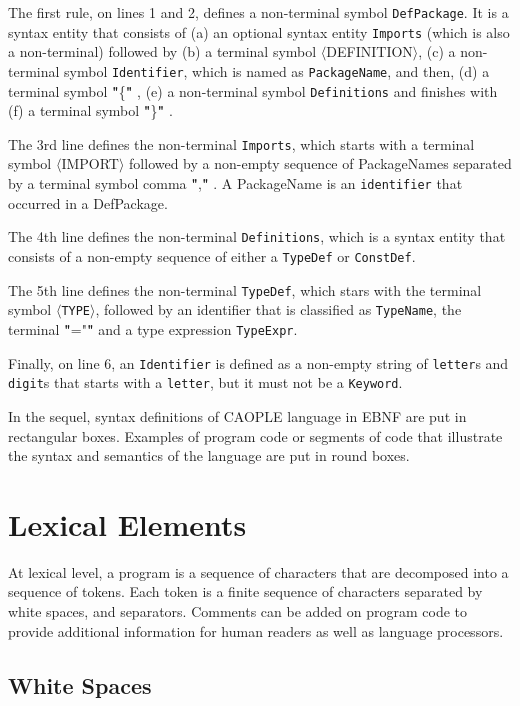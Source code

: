 \documentclass[english]{report}
\newcommand{\tml}[1]{\color{blue}$\langle$#1$\rangle$\color{black}}
\newcommand{\lit}[1]{\color{red} \textbf{"}\color{blue}#1\color{red}\textbf{"} \color{black}}
\begin{document}
The first rule, on lines 1 and 2, defines a non-terminal symbol \texttt{DefPackage}. It is a syntax entity that consists of (a) an optional syntax entity \texttt{Imports} (which is also a non-terminal) followed by (b) a terminal symbol \tml{DEFINITION}, (c) a non-terminal symbol \texttt{Identifier}, which is named as \texttt{PackageName}, and then, (d) a terminal symbol \lit{\{}, (e) a non-terminal symbol \texttt{Definitions} and finishes with (f) a terminal symbol \lit{\}}. 

The 3rd line defines the non-terminal \texttt{Imports}, which starts with a terminal symbol \tml{IMPORT} followed by a non-empty sequence of PackageNames separated by a terminal symbol comma \lit{,}. A PackageName is an \texttt{identifier} that occurred in a DefPackage.  

The 4th line defines the non-terminal \texttt{Definitions}, which is a syntax entity that consists of a non-empty sequence of either a \texttt{TypeDef} or \texttt{ConstDef}. 

The 5th line defines the non-terminal \texttt{TypeDef}, which stars with the terminal symbol \texttt{\tml{TYPE}}, followed by an identifier that is classified as \texttt{TypeName}, the terminal \lit{="} and a type expression \texttt{TypeExpr}. 

Finally, on line 6, an \texttt{Identifier} is defined as a non-empty string of \texttt{letter}s and \texttt{digit}s that starts with a \texttt{letter}, but it must not be a \texttt{Keyword}. 

In the sequel, syntax definitions of CAOPLE language in EBNF are put in rectangular boxes. Examples of program code or segments of code that illustrate the syntax and semantics of the language are put in round boxes.

\chapter{Lexical Elements}\label{sect:Lexical}

At lexical level, a program is a sequence of characters that are decomposed into a sequence of tokens. Each token is a finite sequence of characters separated by white spaces, and separators. Comments can be added on program code to provide additional information for human readers as well as language processors. 

\section{White Spaces} 
\end{document}
